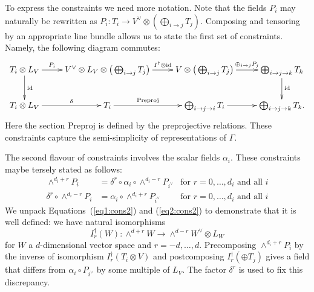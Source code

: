 \documentclass{amsart}
\theoremstyle{definition}
\begin{document}
To express the constraints we need more notation.
Note that the fields $P_i$ may naturally be rewritten as $P_i \colon T_i \rightarrow V^\vee \otimes (\bigoplus_{i \rightarrow j} T_j)$.
Composing and tensoring by an appropriate line bundle allows us to state the first set of constraints.
Namely, the following diagram commutes:
\begin{equation*}
    \xymatrix{T_i \otimes L_V \ar[r]^-{P_i} \ar[d]^{\text{id}} & V^\vee \otimes L_V \otimes \big(\bigoplus_{i \rightarrow j} T_j\big) \ar[r]^-{I^\dagger \otimes \text{id}} & V \otimes \big(\bigoplus_{i \rightarrow j} T_j\big) \ar[r]^-{\oplus_{i \rightarrow j} P_j} & \bigoplus_{i \rightarrow j \rightarrow k} T_k \ar[d]^{\text{id}} \\
    T_i \otimes L_V \ar[r]^-{\delta} & T_i \ar[r]^-{\text{Preproj}} & \bigoplus_{i \rightarrow j \rightarrow i} T_i \ar[r] & \bigoplus_{i \rightarrow j \rightarrow k} T_k.
    }
\end{equation*}
Here the section $\text{Preproj}$ is defined by the preprojective relations.
These constraints capture the semi-simplicity of representations of $\Gamma$.

The second flavour of constraints involves the scalar fields $\alpha_i$.
These constraints maybe tersely stated as follows:
\begin{align}
    \wedge^{d_i+r} P_i &= \delta^r \circ \alpha_i \circ \wedge^{d_i-r} P_{i^\vee}   &\text{for} \,\, r =0,\ldots, d_i \text{ and all } i  \label{eq1:cons2} \\
    \delta^r \circ \wedge^{d_i-r} P_i &= \alpha_i \circ \wedge^{d_i+r} P_{i^\vee} &\text{for} \,\, r=0,\ldots, d_i \text{ and all } i  \label{eq2:cons2} 
\end{align}
We unpack Equations~(\ref{eq1:cons2}) and (\ref{eq2:cons2}) to demonstrate that it is well defined: we have natural isomorphisms
$$I^\dagger_r(W) \colon \wedge^{d+r} W \rightarrow \wedge^{d-r} W^\vee \otimes L_W$$ for $W$ a $d$-dimensional vector space and $r= -d, \ldots, d$.
Precomposing $\wedge^{d_i+r} P_i$ by the inverse of isomorphism $I^{\dagger}_r(T_i \otimes V)$ and postcomposing $I^{\dagger}_r(\oplus T_j)$ gives a field that differs from $\alpha_i \circ P_{i^\vee}$ by some multiple of $L_V$.
The factor $\delta^r$ is used to fix this discrepancy.
\end{document}
